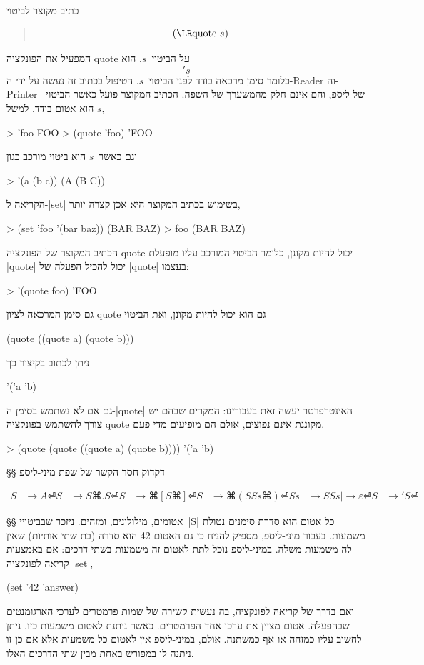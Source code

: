 כתיב מקוצר לביטוי
\begin{LTR}
\begin{quote}
  \setLTR \[
    \text{(\E|quote~$s$|)}
\] \end{quote}
\end{LTR}
המפעיל את הפונקציה quote על הביטוי~$s$, הוא \[
  's
\] כלומר סימן מרכאה בודד
לפני הביטוי~$s$. הטיפול בכתיב זה נעשה על ידי
ה-Reader וה-Printer של ליספ, והם אינם חלק מהמשערך של השפה.
הכתיב המקוצר פועל כאשר הביטוי~$s$ הוא אטום בודד, למשל,
\begin{LISP}
> 'foo
FOO
> (quote 'foo)
'FOO
\end{LISP}
וגם כאשר~$s$ הוא ביטוי מורכב כגון
\begin{LISP}
> '(a (b c))
(A (B C))
\end{LISP}
הקריאה ל-\E|set| בשימוש בכתיב המקוצר היא אכן קצרה יותר,
\begin{LISP}
> (set 'foo '(bar baz))
(BAR BAZ)
> foo
(BAR BAZ)
\end{LISP}
הכתיב המקוצר של הפונקציה quote יכול להיות מקונן, כלומר הביטוי המורכב עליו
מופעלת \E|quote| יכול להכיל הפעלה של \E|quote| בעצמו:
\begin{LISP}
> '(quote foo)
'FOO
\end{LISP}
גם סימן המרכאה לציון quote גם הוא יכול להיות מקונן, ואת הביטוי
\begin{LISP}
(quote ((quote a) (quote b)))
\end{LISP}
ניתן לכתוב בקיצור כך
\begin{LISP}
'('a 'b)
\end{LISP}
גם אם לא נשתמש בסימן ה-\E|quote| האינטרפרטר יעשה זאת בעבורינו:
המקרים שבהם יש צורך להשתמש בפונקציה quote מקוננת אינם נפוצים, אולם הם מופיעים
מדי פעם.
\begin{LISP}
> (quote (quote ((quote a) (quote b))))
'('a 'b)
\end{LISP}

§§ דקדוק חסר הקשר של שפת מיני-ליספ

\begin{equation}
  \label{eq:lisp}
  \begin{split}
    S &→A ⏎
    S &→S ⌘. S ⏎
    S &→⌘[ S ⌘] ⏎
    S &→⌘(S Ss ⌘) ⏎
    Ss &→S Ss |→ε ⏎
    S &→'S ⏎
  \end{split}
\end{equation}

§§ אטומים, מילולונים, ומזהים.
ניזכר שבביטויי~\E|S| כל אטום הוא סדרת סימנים נטולת משמעות. בעבור מיני-ליספ,
מספיק להניח כי גם האטום 42 הוא סדרה (בת שתי אותיות) שאין לה משמעות משלה.
במיני-ליספ נוכל לתת לאטום זה משמעות בשתי דרכים: אם באמצעות קריאה לפונקציה
\E|set|,
\begin{LISP}
(set '42 'answer)
\end{LISP}
ואם בדרך של קריאה לפונקציה, בה נעשית קשירה של שמות פרמטרים לערכי הארגומנטים
שבהפעלה. אטום מציין את ערכו אחד הפרמטרים. כאשר ניתנת לאטום משמעות כזו, ניתן
לחשוב עליו כמזהה או אף כמשתנה. אולם, במיני-ליספ אין לאטום כל משמעות אלא אם כן
זו ניתנה לו במפורש באחת מבין שתי הדרכים האלו.

